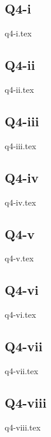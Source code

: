 \documentclass[crop=false,fleqn]{standalone}
\begin{document}
    \subsection*{Q4-i}
    {q4-i.tex}

    \subsection*{Q4-ii}
    {q4-ii.tex}

    \subsection*{Q4-iii}
    {q4-iii.tex}

    \subsection*{Q4-iv}
    {q4-iv.tex}

    \subsection*{Q4-v}
    {q4-v.tex}

    \subsection*{Q4-vi}
    {q4-vi.tex}

    \subsection*{Q4-vii}
    {q4-vii.tex}

    \subsection*{Q4-viii}
    {q4-viii.tex}
\end{document}
